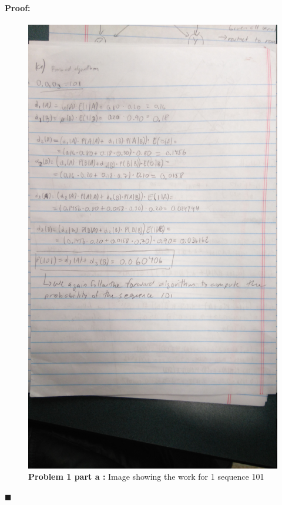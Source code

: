 \documentclass[12pt]{article}
\newenvironment{proof}{\paragraph{Proof: }}{\hfill$\blacksquare$}
\begin{document}
\begin{proof}
\begin{figure}[!htbp]
\centering
\includegraphics[width = 13cm]{hw6_1a_2.jpg}
\caption{\textbf{Problem 1 part a :} Image showing the work for 1 sequence 101}
\end{figure}

\newpage


\end{proof}
\end{document}
